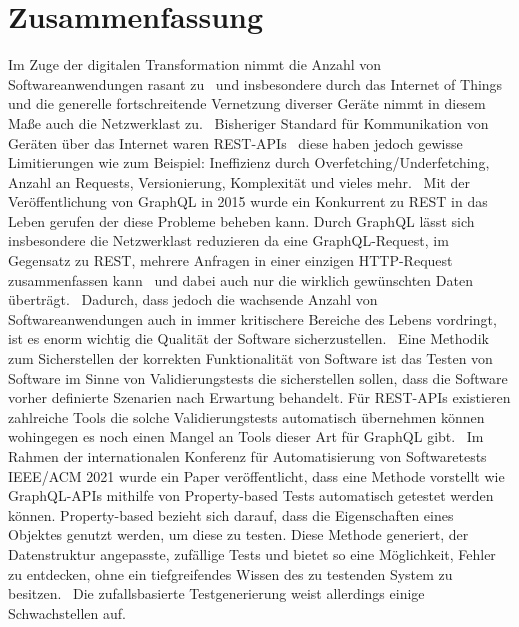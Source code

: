 \chapter{Zusammenfassung}

Im Zuge der digitalen Transformation nimmt die Anzahl von Softwareanwendungen rasant zu~\cite{digitale-transformation} und insbesondere durch das
Internet of Things und die generelle fortschreitende Vernetzung diverser Geräte nimmt in diesem Maße auch die Netzwerklast zu.~\cite{iot-traffic}
Bisheriger Standard für Kommunikation von Geräten über das Internet waren REST-APIs~\cite[vgl. Introduction]{hygraph} diese haben jedoch gewisse
Limitierungen wie zum Beispiel: Ineffizienz durch Overfetching/Underfetching, Anzahl an Requests, Versionierung, Komplexität und vieles mehr.~\cite{hygraph}
Mit der Veröffentlichung von GraphQL in 2015 wurde ein Konkurrent zu REST in das Leben gerufen der diese Probleme beheben kann.
Durch GraphQL lässt sich insbesondere die Netzwerklast reduzieren da eine GraphQL-Request, im Gegensatz zu REST, mehrere Anfragen in einer
einzigen HTTP-Request zusammenfassen kann~\cite{awsrestgraphql} und dabei auch nur die wirklich gewünschten Daten überträgt.~\cite[vgl. Advantages of GraphQL APIs]{hygraph}
Dadurch, dass jedoch die wachsende Anzahl von Softwareanwendungen auch in immer kritischere Bereiche des Lebens vordringt, ist es
enorm wichtig die Qualität der Software sicherzustellen.~\cite[S. 16]{software-testing}
Eine Methodik zum Sicherstellen der korrekten Funktionalität von Software ist das Testen von Software im Sinne von Validierungstests die sicherstellen sollen,
dass die Software vorher definierte Szenarien nach Erwartung behandelt.
Für REST-APIs existieren zahlreiche Tools die solche Validierungstests automatisch übernehmen können wohingegen es noch einen Mangel
an Tools dieser Art für GraphQL gibt.~\cite[vgl. Introduction]{property-based-testing}
Im Rahmen der internationalen Konferenz für Automatisierung von Softwaretests IEEE/ACM 2021 wurde ein Paper veröffentlicht, dass eine Methode vorstellt wie GraphQL-APIs mithilfe von
Property-based Tests automatisch getestet werden können.
Property-based bezieht sich darauf, dass die Eigenschaften eines Objektes genutzt werden, um diese zu testen.
Diese Methode generiert, der Datenstruktur angepasste, zufällige Tests und bietet so eine Möglichkeit, Fehler zu entdecken, ohne ein tiefgreifendes Wissen
des zu testenden System zu besitzen.~\cite[vgl. Proposed Method]{property-based-testing}
Die zufallsbasierte Testgenerierung weist allerdings einige Schwachstellen auf.
